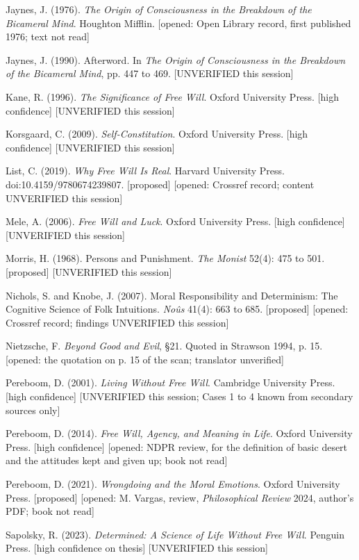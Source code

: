 \documentclass[11pt]{article}
\begin{document}
Jaynes, J. (1976). \emph{The Origin of Consciousness in the Breakdown of the Bicameral Mind}. Houghton Mifflin. [opened: Open Library record, first published 1976; text not read]

Jaynes, J. (1990). Afterword. In \emph{The Origin of Consciousness in the Breakdown of the Bicameral Mind}, pp. 447 to 469. [UNVERIFIED this session]

Kane, R. (1996). \emph{The Significance of Free Will}. Oxford University Press. [high confidence] [UNVERIFIED this session]

Korsgaard, C. (2009). \emph{Self-Constitution}. Oxford University Press. [high confidence] [UNVERIFIED this session]

List, C. (2019). \emph{Why Free Will Is Real}. Harvard University Press. doi:10.4159/\allowbreak{}9780674239807. [proposed] [opened: Crossref record; content UNVERIFIED this session]

Mele, A. (2006). \emph{Free Will and Luck}. Oxford University Press. [high confidence] [UNVERIFIED this session]

Morris, H. (1968). Persons and Punishment. \emph{The Monist} 52(4): 475 to 501. [proposed] [UNVERIFIED this session]

Nichols, S. and Knobe, J. (2007). Moral Responsibility and Determinism: The Cognitive Science of Folk Intuitions. \emph{Noûs} 41(4): 663 to 685. [proposed] [opened: Crossref record; findings UNVERIFIED this session]

Nietzsche, F. \emph{Beyond Good and Evil}, §21. Quoted in Strawson 1994, p. 15. [opened: the quotation on p. 15 of the scan; translator unverified]

Pereboom, D. (2001). \emph{Living Without Free Will}. Cambridge University Press. [high confidence] [UNVERIFIED this session; Cases 1 to 4 known from secondary sources only]

Pereboom, D. (2014). \emph{Free Will, Agency, and Meaning in Life}. Oxford University Press. [high confidence] [opened: NDPR review, for the definition of basic desert and the attitudes kept and given up; book not read]

Pereboom, D. (2021). \emph{Wrongdoing and the Moral Emotions}. Oxford University Press. [proposed] [opened: M. Vargas, review, \emph{Philosophical Review} 2024, author's PDF; book not read]

Sapolsky, R. (2023). \emph{Determined: A Science of Life Without Free Will}. Penguin Press. [high confidence on thesis] [UNVERIFIED this session]
\end{document}
